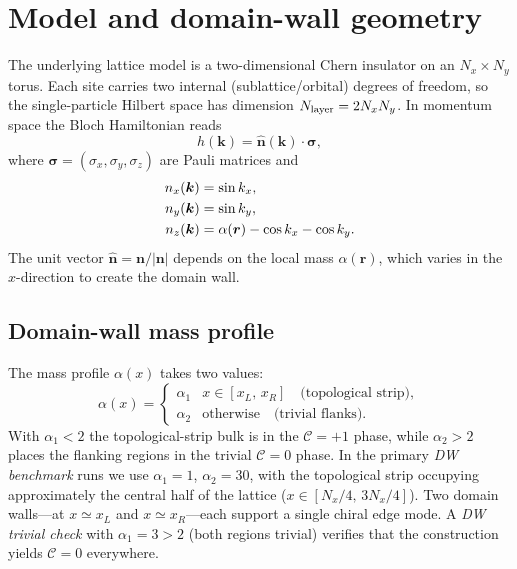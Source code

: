 \documentclass[aps,prb,twocolumn,showpacs,floatfix]{revtex4-2}
\newcommand{\Cchern}{\mathcal{C}}
\begin{document}
\maketitle

\section{Model and domain-wall geometry}
\label{sec:model}

The underlying lattice model is a two-dimensional Chern insulator on an
$N_x \times N_y$ torus.
Each site carries two internal (sublattice/orbital) degrees of freedom,
so the single-particle Hilbert space has dimension $N_{\rm layer} = 2 N_x N_y$.
In momentum space the Bloch Hamiltonian reads
\begin{equation}
h(\bm{k}) = \hat{\bm{n}}(\bm{k}) \cdot \bm{\sigma},
\label{eq:bloch}
\end{equation}
where $\bm{\sigma} = (\sigma_x, \sigma_y, \sigma_z)$ are Pauli matrices and
\begin{align}
n_x(\bm{k}) &= \sin k_x, \notag \\
n_y(\bm{k}) &= \sin k_y, \notag \\
n_z(\bm{k}) &= \alpha(\bm{r}) - \cos k_x - \cos k_y.
\label{eq:bloch_n}
\end{align}
The unit vector $\hat{\bm{n}} = \bm{n}/|\bm{n}|$ depends on the local mass
$\alpha(\bm{r})$, which varies in the $x$-direction to create the domain wall.

\subsection{Domain-wall mass profile}

The mass profile $\alpha(x)$ takes two values:
\begin{equation}
\alpha(x) = \begin{cases}
\alpha_1 & x \in [x_L,\, x_R] \quad \text{(topological strip)}, \\
\alpha_2 & \text{otherwise} \quad \text{(trivial flanks)}.
\end{cases}
\label{eq:mass}
\end{equation}
With $\alpha_1 < 2$ the topological-strip bulk is in the $\Cchern = +1$ phase,
while $\alpha_2 > 2$ places the flanking regions in the trivial $\Cchern = 0$ phase.
In the primary \emph{DW benchmark} runs we use $\alpha_1 = 1$, $\alpha_2 = 30$,
with the topological strip occupying approximately the central half of the lattice
($x \in [N_x/4,\, 3N_x/4]$).
Two domain walls—at $x \simeq x_L$ and $x \simeq x_R$—each support a single
chiral edge mode.
A \emph{DW trivial check} with $\alpha_1 = 3 > 2$ (both regions trivial) verifies
that the construction yields $\Cchern = 0$ everywhere.
\end{document}
